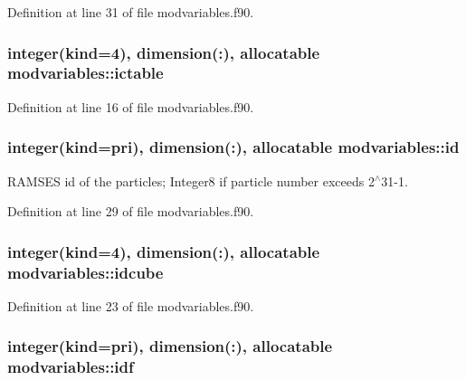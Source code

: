 Definition at line 31 of file modvariables.\+f90.

\subsubsection[{\texorpdfstring{ictable}{ictable}}]{\setlength{\rightskip}{0pt plus 5cm}integer(kind=4), dimension(\+:), allocatable modvariables\+::ictable}\hypertarget{namespacemodvariables_a2de620524061386e6addabfa15a6b020}{}\label{namespacemodvariables_a2de620524061386e6addabfa15a6b020}


Definition at line 16 of file modvariables.\+f90.

\subsubsection[{\texorpdfstring{id}{id}}]{\setlength{\rightskip}{0pt plus 5cm}integer(kind={\bf pri}), dimension(\+:), allocatable modvariables\+::id}\hypertarget{namespacemodvariables_ac2069a0665c46610db9e57a5d5eaf195}{}\label{namespacemodvariables_ac2069a0665c46610db9e57a5d5eaf195}


R\+A\+M\+S\+ES id of the particles; Integer8 if particle number exceeds 2$^\wedge$31-\/1. 



Definition at line 29 of file modvariables.\+f90.

\subsubsection[{\texorpdfstring{idcube}{idcube}}]{\setlength{\rightskip}{0pt plus 5cm}integer(kind=4), dimension(\+:), allocatable modvariables\+::idcube}\hypertarget{namespacemodvariables_a22925cb23ea4a80a06b3f4b67b62102e}{}\label{namespacemodvariables_a22925cb23ea4a80a06b3f4b67b62102e}


Definition at line 23 of file modvariables.\+f90.

\subsubsection[{\texorpdfstring{idf}{idf}}]{\setlength{\rightskip}{0pt plus 5cm}integer(kind={\bf pri}), dimension(\+:), allocatable modvariables\+::idf}\hypertarget{namespacemodvariables_a74cd7fb485e34ae685664db5b2629aa9}{}\label{namespacemodvariables_a74cd7fb485e34ae685664db5b2629aa9}


